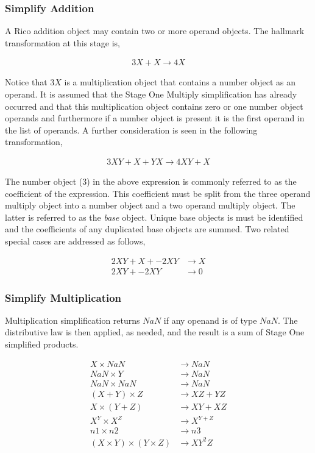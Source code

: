 \subsubsection{Simplify Addition}

A Rico addition object may contain two or more operand objects. The hallmark transformation at this stage is,

\begin{align*}
3X + X \rightarrow 4X
\end{align*}

Notice that $3X$ is a multiplication object that contains a number object as an operand. It is assumed that the Stage One Multiply simplification has already occurred and that this multiplication object contains zero or one number object operands and furthermore if a number object is present it is the first operand in the list of operands. A further consideration is seen in the following transformation,

\begin{align*}
3XY + X + YX \rightarrow 4XY + X
\end{align*}

The number object ($3$) in the above expression is commonly referred to as the coefficient of the expression. This coefficient must be split from the three operand multiply object into a number object and a two operand multiply object. The latter is referred to as the \emph{base} object. Unique base objects is must be identified and the coefficients of any duplicated base objects are summed. Two related special cases are addressed as follows,

\begin{align*}
2XY + X + -2XY &\rightarrow X\\
2XY + -2XY     &\rightarrow 0
\end{align*}

\subsubsection{Simplify Multiplication}

Multiplication simplification returns $NaN$ if any openand is of type $NaN$. The distributive law is then applied, as needed, and the result is a sum of Stage One simplified products.

\begin{align*}
X \times NaN   &\rightarrow NaN \\
NaN \times Y   &\rightarrow NaN \\
NaN \times NaN &\rightarrow NaN\\
(X+Y) \times Z &\rightarrow XZ + YZ\\
X \times (Y+Z) &\rightarrow XY + XZ\\
X^Y \times X^Z &\rightarrow X^{Y+Z}\\
n1 \times n2  &\rightarrow n3\\
(X \times Y) \times (Y \times Z) &\rightarrow XY^2Z
\end{align*}

